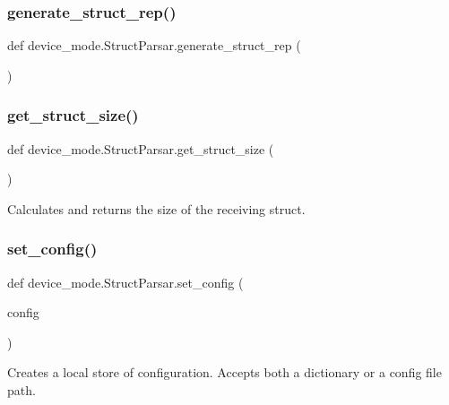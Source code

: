 \subsubsection{\texorpdfstring{generate\+\_\+struct\+\_\+rep()}{generate\_struct\_rep()}}
{\footnotesize\ttfamily def device\+\_\+mode.\+Struct\+Parsar.\+generate\+\_\+struct\+\_\+rep (\begin{DoxyParamCaption}{ }\end{DoxyParamCaption})}

\mbox{\label{classdevice__mode_1_1StructParsar_ad08ea57819388138c2e94a43780b6da5}} 
\subsubsection{\texorpdfstring{get\+\_\+struct\+\_\+size()}{get\_struct\_size()}}
{\footnotesize\ttfamily def device\+\_\+mode.\+Struct\+Parsar.\+get\+\_\+struct\+\_\+size (\begin{DoxyParamCaption}{ }\end{DoxyParamCaption})}

\begin{DoxyVerb}Calculates and returns the size of the receiving struct.
\end{DoxyVerb}
 \mbox{\label{classdevice__mode_1_1StructParsar_a4cdbf854c368e74051b505cca98ec41e}} 
\subsubsection{\texorpdfstring{set\+\_\+config()}{set\_config()}}
{\footnotesize\ttfamily def device\+\_\+mode.\+Struct\+Parsar.\+set\+\_\+config (\begin{DoxyParamCaption}\item[{}]{config }\end{DoxyParamCaption})}

\begin{DoxyVerb}Creates a local store of configuration.
Accepts both a dictionary or a config file path.
\end{DoxyVerb}
 

